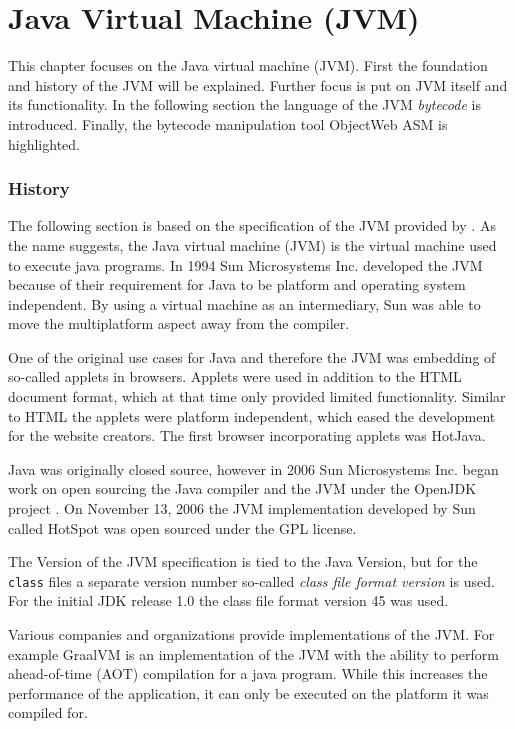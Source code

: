 \chapter{Java Virtual Machine (JVM)}

This chapter focuses on the Java virtual machine (JVM). First the foundation and history of the JVM will be explained. Further focus is put on JVM itself and its functionality. In the following section the language of the JVM \textit{bytecode} is introduced. Finally, the bytecode manipulation tool ObjectWeb ASM is highlighted.

\subsection{History}

The following section is based on the specification of the JVM provided by \textcite{JVMHistoryOracle}. As the name suggests, the Java virtual machine (JVM) is the virtual machine used to execute java programs. In 1994 Sun Microsystems Inc. developed the JVM because of their requirement for Java to be platform and operating system independent. By using a virtual machine as an intermediary, Sun was able to move the multiplatform aspect away from the compiler. 

One of the original use cases for Java and therefore the JVM was embedding of so-called applets in browsers. Applets were used in addition to the HTML document format, which at that time only provided limited functionality. Similar to HTML the applets were platform independent, which eased the development for the website creators. The first browser incorporating applets was HotJava. 

Java was originally closed source, however in 2006 Sun Microsystems Inc. began work on open sourcing the Java compiler and the JVM under the OpenJDK project \parencite{SunOpenSourceJava}. On November 13, 2006 the JVM implementation developed by Sun called HotSpot was open sourced under the GPL license.

The Version of the JVM specification is tied to the Java Version, but for the \texttt{class} files a separate version number so-called \textit{class file format version} is used. For the initial JDK release 1.0 the class file format version 45 was used. 

Various companies and organizations provide implementations of the JVM. For example GraalVM is an implementation of the JVM with the ability to perform ahead-of-time (AOT) compilation for a java program. While this increases the performance of the application, it can only be executed on the platform it was compiled for. 






